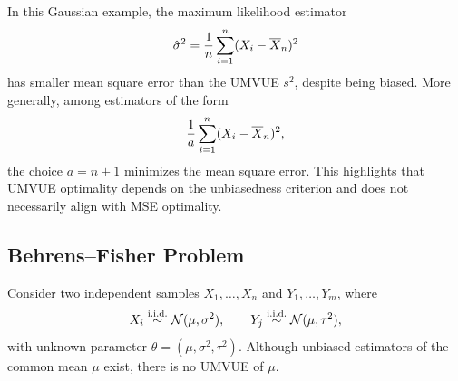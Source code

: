 \begin{note}
In this Gaussian example, the maximum likelihood estimator
\[
    \hat\sigma^2 = \frac{1}{n}\sum\limits_{i=1}^{n}(X_i-\overline X_n)^2
\]
has smaller mean square error than the UMVUE \(s^2\), despite being biased.
More generally, among estimators of the form
\[
    \frac{1}{a}\sum\limits_{i=1}^{n}(X_i-\overline X_n)^2,
\]
the choice \(a=n+1\) minimizes the mean square error.
This highlights that UMVUE optimality depends on the unbiasedness criterion and
does not necessarily align with MSE optimality.
\end{note}

\subsection{Behrens--Fisher Problem}%
\label{sub:bfp}

\begin{pro}
Consider two independent samples \(X_1,\dots ,X_{n}\) and \(Y_1,\dots ,Y_{m}\), where
\[
X_i \stackrel{\text{i.i.d.}}{\sim} \mathcal{N}(\mu,\sigma^2),
\qquad
Y_j \stackrel{\text{i.i.d.}}{\sim} \mathcal{N}(\mu,\tau^2),
\]
with unknown parameter \(\theta=(\mu,\sigma^2,\tau^2)\).
Although unbiased estimators of the common mean \(\mu\) exist, there is no UMVUE of \(\mu\).
\end{pro}

